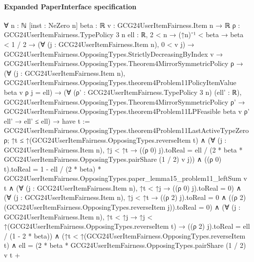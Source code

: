 \documentclass[10pt]{article}
\begin{document}
\paragraph{Expanded PaperInterface specification}
\begin{ReviewVerbatim}
∀ {n : ℕ} [inst : NeZero n] {beta : ℝ} {v : GCG24UserItemFairness.Item n → ℝ} {ρ : GCG24UserItemFairness.TypePolicy 3 n}
  {ell : ℝ},
  2 < n →
    (↑n)⁻¹ < beta →
      beta < 1 / 2 →
        (∀ (j : GCG24UserItemFairness.Item n), 0 < v j) →
          GCG24UserItemFairness.OpposingTypes.StrictlyDecreasingByIndex v →
            GCG24UserItemFairness.OpposingTypes.Theorem4MirrorSymmetricPolicy ρ →
              (∀ (j : GCG24UserItemFairness.Item n),
                  GCG24UserItemFairness.OpposingTypes.theorem4Problem11PolicyItemValue beta v ρ j = ell) →
                (∀ (ρ' : GCG24UserItemFairness.TypePolicy 3 n) (ell' : ℝ),
                    GCG24UserItemFairness.OpposingTypes.Theorem4MirrorSymmetricPolicy ρ' →
                      GCG24UserItemFairness.OpposingTypes.theorem4Problem11LPFeasible beta v ρ' ell' → ell' ≤ ell) →
                  have t := GCG24UserItemFairness.OpposingTypes.theorem4Problem11LastActiveTypeZero ρ;
                  ↑t ≤ ↑(GCG24UserItemFairness.OpposingTypes.reverseItem t) ∧
                    (∀ (j : GCG24UserItemFairness.Item n),
                        ↑j < ↑t →
                          ((ρ 0) j).toReal =
                            ell / (2 * beta * GCG24UserItemFairness.OpposingTypes.pairShare (1 / 2) v j)) ∧
                      ((ρ 0) t).toReal =
                          1 -
                            ell / (2 * beta) * GCG24UserItemFairness.OpposingTypes.paper_lemma15_problem11_leftSum v t ∧
                        (∀ (j : GCG24UserItemFairness.Item n), ↑t < ↑j → ((ρ 0) j).toReal = 0) ∧
                          (∀ (j : GCG24UserItemFairness.Item n),
                              ↑j < ↑t →
                                ((ρ 2) j).toReal = 0 ∧
                                  ((ρ 2) (GCG24UserItemFairness.OpposingTypes.reverseItem j)).toReal = 0) ∧
                            (∀ (j : GCG24UserItemFairness.Item n),
                                ↑t < ↑j →
                                  ↑j < ↑(GCG24UserItemFairness.OpposingTypes.reverseItem t) →
                                    ((ρ 2) j).toReal = ell / (1 - 2 * beta)) ∧
                              (↑t < ↑(GCG24UserItemFairness.OpposingTypes.reverseItem t) ∧
                                  ell =
                                      (2 * beta * GCG24UserItemFairness.OpposingTypes.pairShare (1 / 2) v t +

\end{ReviewVerbatim}
\end{document}
